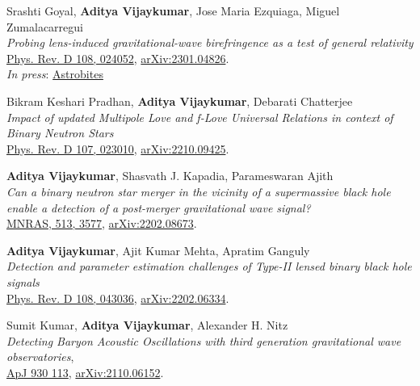 \begin{etaremune}
	\item
	Srashti Goyal, \textbf{Aditya Vijaykumar}, Jose Maria Ezquiaga, Miguel Zumalacarregui \\
	\textit{Probing lens-induced gravitational-wave birefringence as a test of general relativity}\\
	\href{https://journals.aps.org/prd/abstract/10.1103/PhysRevD.108.024052}{Phys. Rev. D 108, 024052}, \href{https://arxiv.org/abs/2301.04826}{arXiv:2301.04826}.\\
    \textit{In press}: \href{https://astrobites.org/2023/04/11/gravitational-waves-a-la-general-relativity-or-scrambled/}{Astrobites}


    \item 
	Bikram Keshari Pradhan, \textbf{Aditya Vijaykumar}, Debarati Chatterjee \\
	\textit{Impact of updated Multipole Love and f-Love Universal Relations in context of Binary Neutron Stars}\\
	\href{https://journals.aps.org/prd/abstract/10.1103/PhysRevD.107.023010}{Phys. Rev. D 107, 023010}, \href{https://arxiv.org/abs/2210.09425}{arXiv:2210.09425}.
 
 \item 
	\textbf{Aditya Vijaykumar}, Shasvath J. Kapadia, Parameswaran Ajith\\
	\textit{Can a binary neutron star merger in the vicinity of a supermassive black hole enable a detection of a post-merger gravitational wave signal?}\\
	\href{https://academic.oup.com/mnras/article/513/3/3577/6573885}{MNRAS, 513, 3577}, \href{https://arxiv.org/abs/2202.08673}{arXiv:2202.08673}.
	
	\item \textbf{Aditya Vijaykumar}, Ajit Kumar Mehta, Apratim Ganguly\\
	\textit{Detection and parameter estimation challenges of Type-II lensed binary black hole signals}\\
	\href{https://journals.aps.org/prd/abstract/10.1103/PhysRevD.108.043036}{Phys. Rev. D 108, 043036}, \href{https://arxiv.org/abs/2202.06334}{arXiv:2202.06334}.

	\item 
	Sumit Kumar, \textbf{Aditya Vijaykumar}, Alexander H. Nitz\\
	\textit{Detecting Baryon Acoustic Oscillations with third generation gravitational wave observatories},\\
	\href{https://iopscience.iop.org/article/10.3847/1538-4357/ac5e34}{ApJ 930 113}, \href{https://arxiv.org/abs/2110.06152}{arXiv:2110.06152}.


\end{etaremune}
